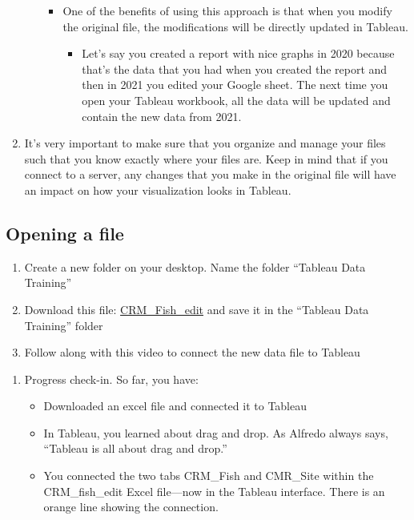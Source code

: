 \documentclass[
]{book}
\providecommand{\tightlist}{%
  \setlength{\itemsep}{0pt}\setlength{\parskip}{0pt}}
\begin{document}
\begin{enumerate}
\begin{itemize}
    \begin{itemize}
    \tightlist
    \item
      One of the benefits of using this approach is that when you modify the original file, the modifications will be directly updated in Tableau.

      \begin{itemize}
      \tightlist
      \item
        Let's say you created a report with nice graphs in 2020 because that's the data that you had when you created the report and then in 2021 you edited your Google sheet. The next time you open your Tableau workbook, all the data will be updated and contain the new data from 2021.
      \end{itemize}
    \end{itemize}
  \end{itemize}
\item
  It's very important to make sure that you organize and manage your files such that you know exactly where your files are. Keep in mind that if you connect to a server, any changes that you make in the original file will have an impact on how your visualization looks in Tableau.
\end{enumerate}

\hypertarget{opening-a-file}{%
\subsection{Opening a file}\label{opening-a-file}}

\begin{enumerate}
\def\labelenumi{\arabic{enumi}.}
\item
  Create a new folder on your desktop. Name the folder ``Tableau Data Training''
\item
  Download this file: \href{files/CRM_Fish_edit.xlsx}{CRM\_Fish\_edit} and save it in the ``Tableau Data Training'' folder
\item
  Follow along with this video to connect the new data file to Tableau
\end{enumerate}

\begin{enumerate}
\def\labelenumi{\arabic{enumi}.}
\setcounter{enumi}{3}
\tightlist
\item
  Progress check-in. So far, you have:

  \begin{itemize}
  \tightlist
  \item
    Downloaded an excel file and connected it to Tableau
  \item
    In Tableau, you learned about drag and drop. As Alfredo always says, ``Tableau is all about drag and drop.''
  \item
    You connected the two tabs CRM\_Fish and CMR\_Site within the CRM\_fish\_edit Excel file---now in the Tableau interface. There is an orange line showing the connection.
  \end{itemize}
\end{enumerate}
\end{document}
